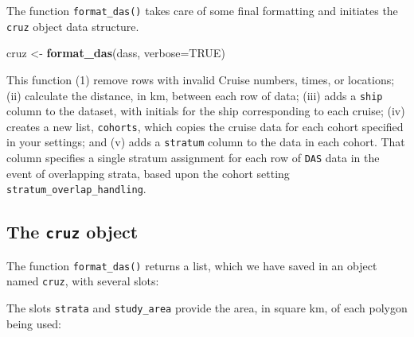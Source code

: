 \documentclass[
]{book}
\newenvironment{Shaded}{\begin{snugshade}}{\end{snugshade}}
\newcommand{\DataTypeTok}[1]{\textcolor[rgb]{0.13,0.29,0.53}{#1}}
\newcommand{\DecValTok}[1]{\textcolor[rgb]{0.00,0.00,0.81}{#1}}
\newcommand{\FloatTok}[1]{\textcolor[rgb]{0.00,0.00,0.81}{#1}}
\newcommand{\KeywordTok}[1]{\textcolor[rgb]{0.13,0.29,0.53}{\textbf{#1}}}
\newcommand{\NormalTok}[1]{#1}
\newcommand{\OperatorTok}[1]{\textcolor[rgb]{0.81,0.36,0.00}{\textbf{#1}}}
\newcommand{\OtherTok}[1]{\textcolor[rgb]{0.56,0.35,0.01}{#1}}
\newcommand{\StringTok}[1]{\textcolor[rgb]{0.31,0.60,0.02}{#1}}
\begin{document}
The function \texttt{format\_das()} takes care of some final formatting and initiates the \texttt{cruz} object data structure.

\begin{Shaded}
\begin{Highlighting}[]
\NormalTok{cruz <-}\StringTok{ }\KeywordTok{format_das}\NormalTok{(dass, }\DataTypeTok{verbose=}\OtherTok{TRUE}\NormalTok{)}
\end{Highlighting}
\end{Shaded}

This function (1) remove rows with invalid Cruise numbers, times, or locations; (ii) calculate the distance, in km, between each row of data; (iii) adds a \texttt{ship} column to the dataset, with initials for the ship corresponding to each cruise; (iv) creates a new list, \texttt{cohorts}, which copies the cruise data for each cohort specified in your settings; and (v) adds a \texttt{stratum} column to the data in each cohort. That column specifies
a single stratum assignment for each row of \texttt{DAS} data in the event of overlapping strata, based upon the cohort setting \texttt{stratum\_overlap\_handling}.

\hypertarget{the-cruz-object}{%
\subsection*{\texorpdfstring{The \texttt{cruz} object}{The cruz object}}\label{the-cruz-object}}

The function \texttt{format\_das()} returns a list, which we have saved in an object named \texttt{cruz}, with several slots:

\begin{Shaded}
\end{Shaded}

The slots \texttt{strata} and \texttt{study\_area} provide the area, in square km, of each polygon being used:

\begin{Shaded}
\end{Shaded}
\end{document}
